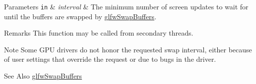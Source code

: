 \begin{DoxyParams}[1]{Parameters}
\mbox{\tt in}  & {\em interval} & The minimum number of screen updates to wait for until the buffers are swapped by \hyperlink{group__context_gafb827800eedbfcbc97b1e5408df668d7}{glfw\-Swap\-Buffers}.\\
\hline
\end{DoxyParams}
\begin{DoxyRemark}{Remarks}
This function may be called from secondary threads.
\end{DoxyRemark}
\begin{DoxyNote}{Note}
Some G\-P\-U drivers do not honor the requested swap interval, either because of user settings that override the request or due to bugs in the driver.
\end{DoxyNote}
\begin{DoxySeeAlso}{See Also}
\hyperlink{group__context_gafb827800eedbfcbc97b1e5408df668d7}{glfw\-Swap\-Buffers} 
\end{DoxySeeAlso}
